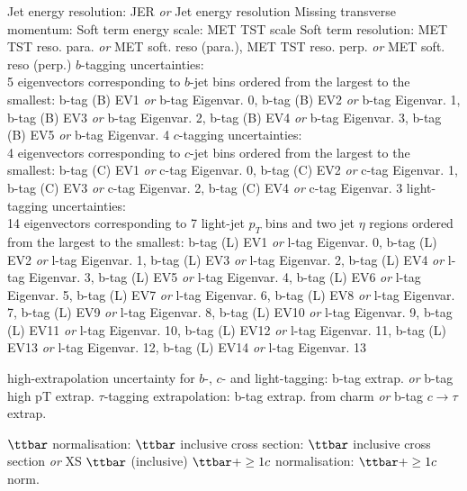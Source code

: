 \ib Jet energy resolution: JER \emph{or} Jet energy resolution
\ib Missing transverse momentum: 
\bi
\ib Soft term energy scale: MET TST scale
\ib Soft term resolution: MET TST reso. para. \emph{or} MET soft. reso (para.), MET TST reso. perp. \emph{or} MET soft. reso (perp.)
\ei
\ib $b$-tagging uncertainties:\\ 5 eigenvectors corresponding to $b$-jet \pt bins ordered from the largest to the smallest: b-tag (B) EV1 \emph{or} b-tag Eigenvar. 0, b-tag (B) EV2 \emph{or} b-tag Eigenvar. 1, b-tag (B) EV3 \emph{or} b-tag Eigenvar. 2, b-tag (B) EV4 \emph{or} b-tag Eigenvar. 3, b-tag (B) EV5 \emph{or} b-tag Eigenvar. 4
\ib $c$-tagging uncertainties:\\ 4 eigenvectors corresponding to $c$-jet \pt bins ordered from the largest to the smallest: b-tag (C) EV1 \emph{or} c-tag Eigenvar. 0, b-tag (C) EV2 \emph{or} c-tag Eigenvar. 1, b-tag (C) EV3 \emph{or} c-tag Eigenvar. 2, b-tag (C) EV4 \emph{or} c-tag Eigenvar. 3
\ib light-tagging uncertainties:\\ 14 eigenvectors corresponding to 7 light-jet $p_{T}$ bins and two jet $\eta$ regions ordered from the largest to the smallest: b-tag (L) EV1 \emph{or} l-tag Eigenvar. 0, b-tag (L) EV2 \emph{or} l-tag Eigenvar. 1, b-tag (L) EV3 \emph{or} l-tag Eigenvar. 2, b-tag (L) EV4 \emph{or} l-tag Eigenvar. 3, b-tag (L) EV5 \emph{or} l-tag Eigenvar. 4, b-tag (L) EV6 \emph{or} l-tag Eigenvar. 5, b-tag (L) EV7 \emph{or} l-tag Eigenvar. 6, b-tag (L) EV8 \emph{or} l-tag Eigenvar. 7, b-tag (L) EV9 \emph{or} l-tag Eigenvar. 8, b-tag (L) EV10 \emph{or} l-tag Eigenvar. 9, b-tag (L) EV11 \emph{or} l-tag Eigenvar. 10, b-tag (L) EV12 \emph{or} l-tag Eigenvar. 11, b-tag (L) EV13 \emph{or} l-tag Eigenvar. 12, b-tag (L) EV14 \emph{or} l-tag Eigenvar. 13

\ib high-\pt extrapolation uncertainty for $b$-, $c$- and light-tagging: b-tag extrap. \emph{or} b-tag high pT extrap.
\ib $\tau$-tagging extrapolation: b-tag extrap. from charm \emph{or} b-tag $c\to\tau$ extrap.

\ib $\ttbar$ normalisation:
\bi
\ib $\ttbar$ inclusive cross section: $\ttbar$ inclusive cross section \emph{or} XS $\ttbar$ (inclusive)
\ib $\ttbar+\ge1c$ normalisation: $\ttbar+\ge1c$ norm.
\ei

